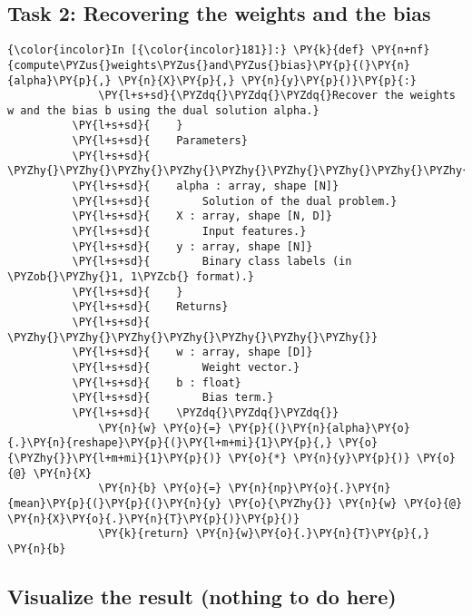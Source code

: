     \hypertarget{task-2-recovering-the-weights-and-the-bias}{%
\subsection{Task 2: Recovering the weights and the
bias}\label{task-2-recovering-the-weights-and-the-bias}}

    \begin{Verbatim}[commandchars=\\\{\}]
{\color{incolor}In [{\color{incolor}181}]:} \PY{k}{def} \PY{n+nf}{compute\PYZus{}weights\PYZus{}and\PYZus{}bias}\PY{p}{(}\PY{n}{alpha}\PY{p}{,} \PY{n}{X}\PY{p}{,} \PY{n}{y}\PY{p}{)}\PY{p}{:}
              \PY{l+s+sd}{\PYZdq{}\PYZdq{}\PYZdq{}Recover the weights w and the bias b using the dual solution alpha.}
          \PY{l+s+sd}{    }
          \PY{l+s+sd}{    Parameters}
          \PY{l+s+sd}{    \PYZhy{}\PYZhy{}\PYZhy{}\PYZhy{}\PYZhy{}\PYZhy{}\PYZhy{}\PYZhy{}\PYZhy{}\PYZhy{}}
          \PY{l+s+sd}{    alpha : array, shape [N]}
          \PY{l+s+sd}{        Solution of the dual problem.}
          \PY{l+s+sd}{    X : array, shape [N, D]}
          \PY{l+s+sd}{        Input features.}
          \PY{l+s+sd}{    y : array, shape [N]}
          \PY{l+s+sd}{        Binary class labels (in \PYZob{}\PYZhy{}1, 1\PYZcb{} format).}
          \PY{l+s+sd}{    }
          \PY{l+s+sd}{    Returns}
          \PY{l+s+sd}{    \PYZhy{}\PYZhy{}\PYZhy{}\PYZhy{}\PYZhy{}\PYZhy{}\PYZhy{}}
          \PY{l+s+sd}{    w : array, shape [D]}
          \PY{l+s+sd}{        Weight vector.}
          \PY{l+s+sd}{    b : float}
          \PY{l+s+sd}{        Bias term.}
          \PY{l+s+sd}{    \PYZdq{}\PYZdq{}\PYZdq{}}
              \PY{n}{w} \PY{o}{=} \PY{p}{(}\PY{n}{alpha}\PY{o}{.}\PY{n}{reshape}\PY{p}{(}\PY{l+m+mi}{1}\PY{p}{,} \PY{o}{\PYZhy{}}\PY{l+m+mi}{1}\PY{p}{)} \PY{o}{*} \PY{n}{y}\PY{p}{)} \PY{o}{@} \PY{n}{X}
              \PY{n}{b} \PY{o}{=} \PY{n}{np}\PY{o}{.}\PY{n}{mean}\PY{p}{(}\PY{p}{(}\PY{n}{y} \PY{o}{\PYZhy{}} \PY{n}{w} \PY{o}{@} \PY{n}{X}\PY{o}{.}\PY{n}{T}\PY{p}{)}\PY{p}{)}
              \PY{k}{return} \PY{n}{w}\PY{o}{.}\PY{n}{T}\PY{p}{,} \PY{n}{b}
\end{Verbatim}

    \hypertarget{visualize-the-result-nothing-to-do-here}{%
\subsection{Visualize the result (nothing to do
here)}\label{visualize-the-result-nothing-to-do-here}}

